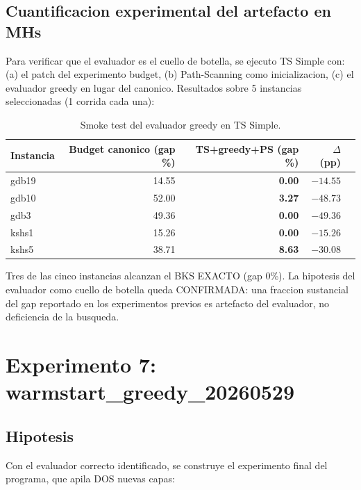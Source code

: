 \subsection{Cuantificacion experimental del artefacto en MHs}

Para verificar que el evaluador es el cuello de botella, se ejecuto
TS Simple con: (a) el patch del experimento budget, (b) Path-Scanning
como inicializacion, (c) el evaluador greedy en lugar del canonico.
Resultados sobre 5 instancias seleccionadas (1 corrida cada una):

\begin{table}[h]
\centering
\caption{Smoke test del evaluador greedy en TS Simple.}
\label{tab:smoke-greedy-ts}
\small
\begin{tabular}{lrrrr}
\toprule
Instancia & Budget canonico (gap \%) & TS+greedy+PS (gap \%) & $\Delta$ (pp) \\
\midrule
gdb19 & 14.55 & \textbf{0.00} & $-14.55$ \\
gdb10 & 52.00 & \textbf{3.27} & $-48.73$ \\
gdb3  & 49.36 & \textbf{0.00} & $-49.36$ \\
kshs1 & 15.26 & \textbf{0.00} & $-15.26$ \\
kshs5 & 38.71 & \textbf{8.63} & $-30.08$ \\
\bottomrule
\end{tabular}
\end{table}

Tres de las cinco instancias alcanzan el BKS EXACTO (gap 0\%). La
hipotesis del evaluador como cuello de botella queda CONFIRMADA: una
fraccion sustancial del gap reportado en los experimentos previos es
artefacto del evaluador, no deficiencia de la busqueda.

\section{Experimento 7: warmstart\_greedy\_20260529}
\label{sec:warmstart-greedy}

\subsection{Hipotesis}

Con el evaluador correcto identificado, se construye el experimento
final del programa, que apila DOS nuevas capas:

